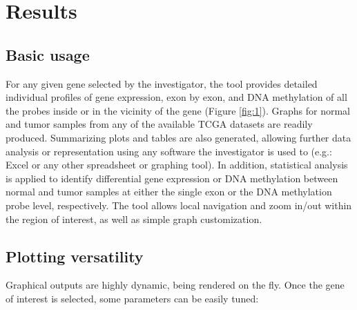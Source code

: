 \documentclass{bmcart}
\begin{document}
\section*{Results}

\subsection*{Basic usage}


For any given gene selected by the investigator, the tool provides detailed individual profiles of gene expression, exon by exon, and DNA methylation of all the probes inside or in the vicinity of the gene (Figure \ref{fig:1}). Graphs for normal and tumor samples from any of the available TCGA datasets are readily produced. Summarizing plots and tables are also generated, allowing further data analysis or representation using any software the investigator is used to (e.g.: Excel or any other spreadsheet or graphing tool). In addition, statistical analysis is applied to identify differential gene expression or DNA methylation between normal and tumor samples at either the single exon or the DNA methylation probe level, respectively. The tool allows local navigation and zoom in/out within the region of interest, as well as simple graph customization.\\ 



\subsection*{Plotting versatility}

Graphical outputs are highly dynamic, being rendered on the fly. {\color{red} Once the gene of interest is selected, some parameters can be easily tuned: }
\end{document}
